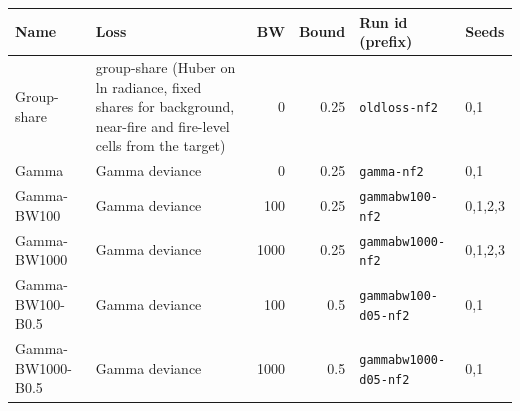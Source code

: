 \begin{tabular}{lp{5.2cm}rrll}
\toprule
Name & Loss & BW & Bound & Run id (prefix) & Seeds \\
\midrule
Group-share & group-share (Huber on ln radiance, fixed shares for background, near-fire and fire-level cells from the target) & 0 & 0.25 & \texttt{oldloss-nf2} & 0,1 \\
Gamma & Gamma deviance & 0 & 0.25 & \texttt{gamma-nf2} & 0,1 \\
Gamma-BW100 & Gamma deviance & 100 & 0.25 & \texttt{gammabw100-nf2} & 0,1,2,3 \\
Gamma-BW1000 & Gamma deviance & 1000 & 0.25 & \texttt{gammabw1000-nf2} & 0,1,2,3 \\
Gamma-BW100-B0.5 & Gamma deviance & 100 & 0.5 & \texttt{gammabw100-d05-nf2} & 0,1 \\
Gamma-BW1000-B0.5 & Gamma deviance & 1000 & 0.5 & \texttt{gammabw1000-d05-nf2} & 0,1 \\
\bottomrule
\end{tabular}
